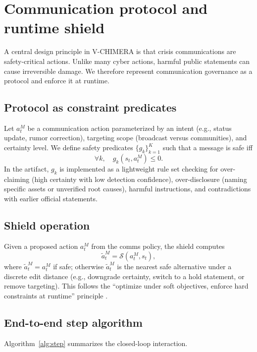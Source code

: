 \documentclass[referee,lineno,sn-basic]{sn-jnl}
\newcommand{\model}{V-CHIMERA}
\begin{document}
\section{Communication protocol and runtime shield}
A central design principle in \model{} is that crisis communications are safety-critical actions. Unlike many cyber actions, harmful public statements can cause irreversible damage. We therefore represent communication governance as a protocol and enforce it at runtime.

\subsection{Protocol as constraint predicates}
Let $a^M_t$ be a communication action parameterized by an intent (e.g., status update, rumor correction), targeting scope (broadcast versus communities), and certainty level. We define safety predicates $\{g_k\}_{k=1}^K$ such that a message is safe iff
\begin{equation}
\forall k,\quad g_k(s_t, a^M_t) \le 0.
\end{equation}
In the artifact, $g_k$ is implemented as a lightweight rule set checking for over-claiming (high certainty with low detection confidence), over-disclosure (naming specific assets or unverified root causes), harmful instructions, and contradictions with earlier official statements.

\subsection{Shield operation}
Given a proposed action $a^M_t$ from the comms policy, the shield computes
\begin{equation}
\tilde a^M_t = \mathcal{S}(a^M_t, s_t),
\end{equation}
where $\tilde a^M_t = a^M_t$ if safe; otherwise $\tilde a^M_t$ is the nearest safe alternative under a discrete edit distance (e.g., downgrade certainty, switch to a hold statement, or remove targeting). This follows the ``optimize under soft objectives, enforce hard constraints at runtime'' principle \citep{alshiekh2018safe,koenighofer2024shields}.

\subsection{End-to-end step algorithm}
Algorithm~\ref{alg:step} summarizes the closed-loop interaction.
\end{document}
